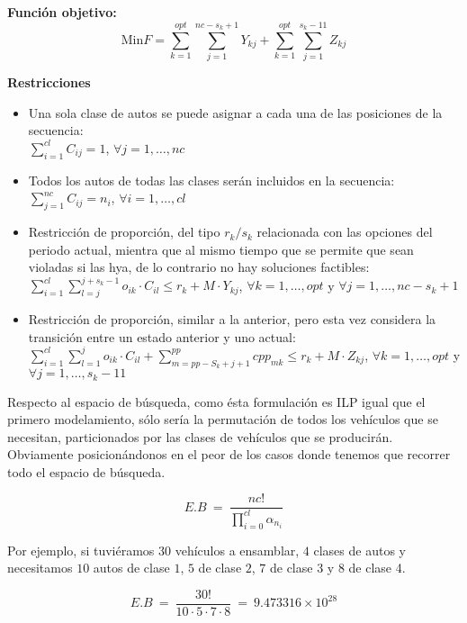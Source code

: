 \textbf{Función objetivo:}
$$\text{Min} F = \sum\limits_{k=1}^{opt} \sum\limits_{j=1}^{nc-s_{k}+1} Y_{kj} + \sum\limits_{k=1}^{opt} \sum\limits_{j=1}^{s_{k}-11} Z_{kj}$$

\textbf{Restricciones}
\begin{itemize}
	\item Una sola clase de autos se puede asignar a cada una de las posiciones de la secuencia:\\ 
		$\sum\limits_{i=1}^{cl} C_{ij} = 1$, $\forall j = 1,\ldots,nc$
	\item Todos los autos de todas las clases serán incluidos en la secuencia:\\
		$\sum\limits_{j=1}^{nc} C_{ij} = n_{i}$, $\forall i = 1,\ldots,cl$
	\item Restricción de proporción, del tipo $r_{k}/s_{k}$ relacionada con las opciones del periodo actual, mientra que al mismo tiempo que se permite
		que sean violadas si las hya, de lo contrario no hay soluciones factibles:\\
		$\sum\limits_{i=1}^{cl} \sum\limits_{l=j}^{j+s_{k}-1} o_{ik} \cdot
		C_{il} \leq r_{k} + M\cdot Y_{kj}$, $\forall k = 1,\ldots,opt$ y $\forall j=1,\ldots, nc-s_{k}+1$
	\item Restricción de proporción, similar a la anterior, pero esta vez considera la transición entre un estado anterior y uno actual:\\
		$\sum\limits_{i=1}^{cl} \sum\limits_{l=1}^{j} o_{ik} \cdot
		C_{il} + \sum\limits_{m=pp-S_{k}+j+1}^{pp} cpp_{mk} \leq r_{k} + M\cdot Z_{kj}$, $\forall k = 1,\ldots,opt$ y $\forall j=1,\ldots, s_{k}-11$
\end{itemize}

Respecto al espacio de búsqueda, como ésta formulación es ILP igual que el primero modelamiento, sólo sería la permutación de todos
los vehículos que se necesitan,  particionados por las clases de vehículos que se producirán. Obviamente posicionándonos en el peor de los casos
donde tenemos que recorrer todo el espacio de búsqueda.

$$E.B\ =\ \frac{nc!}{\prod\limits_{i = 0}^{cl}\alpha_{n_i}}$$

Por ejemplo, si tuviéramos $30$ vehículos a ensamblar, $4$ clases de autos y
necesitamos $10$ autos de clase $1$, $5$ de clase $2$, $7$ de clase $3$ y $8$ de clase 4.

$$E.B\ =\ \frac{30!}{10\cdot 5\cdot 7\cdot 8}\ =\ 9.473316\times 10^{28}$$

